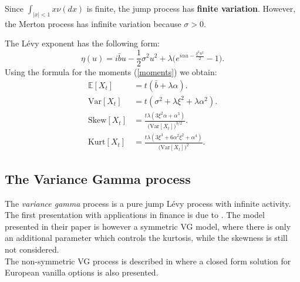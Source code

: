 \documentclass[a4paper,10pt]{article}
\newcommand{\numberset}{\mathbb}
\newcommand{\E}{\numberset{E}}
\begin{document}
Since $\int_{|x|<1} x \nu(dx)$ is finite, the jump process has \textbf{finite variation}. However, 
the Merton process has infinite variation because $\sigma >0$. 

The Lévy exponent has the following form:
\begin{equation}
 \eta(u) = i\bar b u - \frac{1}{2} \sigma^2 u^2 + \lambda \biggl( e^{i\alpha u -\frac{\xi^2 u^2}{2} }-1 \biggr). 
\end{equation}
\newline
Using the formula for the moments (\ref{moments}) we obtain:
\begin{align}\label{Merton_moments}
 \E[X_t] &= t(\bar b+\lambda \alpha). \\ \nonumber
 \mbox{Var}[X_t] &= t(\sigma^2 + \lambda \xi^2 + \lambda \alpha^2). \\ \nonumber
 \mbox{Skew}[X_t] &= \frac{t\lambda (3\xi^2 \alpha + \alpha^3)}{\bigl(\mbox{Var}[X_t])^{3/2}}. \\ \nonumber
 \mbox{Kurt}[X_t] &= \frac{t \lambda (3\xi^3 +6\alpha^2\xi^2 +\alpha^4)}{\bigl(\mbox{Var}[X_t]\bigr)^2}. \nonumber
\end{align} \newline


\subsection{The Variance Gamma process}\label{VG_section}

The \emph{variance gamma} process is a pure jump Lévy process with infinite activity.
The first presentation with applications in finance is due to \cite{MaSe90}. 
The model presented in their paper is however a symmetric VG model, 
where there is only an additional parameter which controls the kurtosis, while the skewness is still not considered.\\
The non-symmetric VG process is described in \cite{MCC98} where a closed form solution for European vanilla options is also presented.\\
\end{document}
